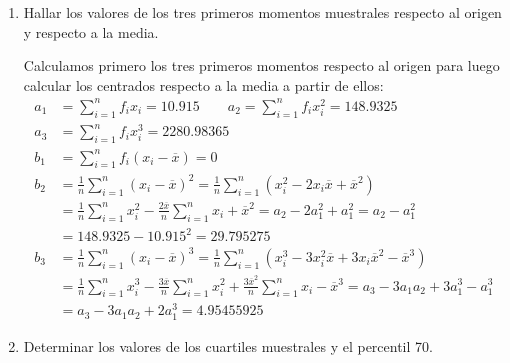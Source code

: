 \begin{ejercicio}
\begin{enumerate}
\begin{figure}[H]
                \caption{Gráfica de la función de distribución muestral.}
                \label{fig:funcion_distribucion_muestral}
            \end{figure}
        \item Hallar los valores de los tres primeros momentos muestrales respecto al origen y respecto a la media.

            Calculamos primero los tres primeros momentos respecto al origen para luego calcular los centrados respecto a la media a partir de ellos:
            \begin{align*}
                a_1 &= \sum_{i=1}^{n} f_i x_i = 10.915 \qquad 
                a_2 = \sum_{i=1}^{n} f_i x_i^2 = 148.9325 \\
                a_3 &= \sum_{i=1}^{n} f_i x_i^3 = 2280.98365 \\
                b_1 &= \sum_{i=1}^{n} f_i {(x_i - \overline{x})}= 0\qquad  \\
                b_2 &= \frac{1}{n}\sum_{i=1}^{n}{(x_i-\overline{x})}^{2} = \frac{1}{n}\sum_{i=1}^{n}(x_i^2 - 2x_i \overline{x}+\overline{x}^2)  \\ &= \frac{1}{n}\sum_{i=1}^{n}x_i^2 - \frac{2\overline{x}}{n}\sum_{i=1}^{n}x_i + \overline{x}^2 = a_2 -2a_1^2 + a_1^2 = a_2 - a_1^2 \\
                    &= 148.9325 - 10.915^2  = 29.795275\\
                b_3 &= \frac{1}{n}\sum_{i=1}^{n} {(x_i-\overline{x})}^{3} = \frac{1}{n}\sum_{i=1}^{n}\left(x_i^3 - 3x_i^2 \overline{x} + 3x_i\overline{x}^2 -\overline{x}^3\right) \\
                    &= \frac{1}{n}\sum_{i=1}^{n}x_i^3 - \frac{3\overline{x}}{n}\sum_{i=1}^{n}x_i^2 + \frac{3\overline{x}^2}{n}\sum_{i=1}^{n}x_i - \overline{x}^3 = a_3 - 3a_1a_2 + 3a_1^3 - a_1^3 \\
                    &= a_3 - 3a_1a_2 + 2a_1^3 = 4.95455925
            \end{align*}
        \item Determinar los valores de los cuartiles muestrales y el percentil 70.


\end{enumerate}
\end{ejercicio}
